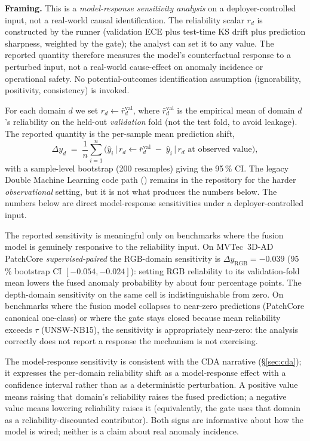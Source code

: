\documentclass[10pt,conference]{IEEEtran}
\begin{document}
\noindent\textbf{Framing.} This is a \emph{model-response sensitivity
analysis} on a deployer-controlled input, not a real-world causal
identification. The reliability scalar $r_d$ is constructed by the
runner (validation ECE plus test-time KS drift plus prediction
sharpness, weighted by the gate); the analyst can set it to any
value. The reported quantity therefore measures the model's
counterfactual response to a perturbed input, not a real-world cause-effect
on anomaly incidence or operational safety. No
potential-outcomes identification assumption (ignorability,
positivity, consistency) is invoked.

For each domain $d$ we set $r_d \leftarrow \bar r_d^{\mathrm{val}}$,
where $\bar r_d^{\mathrm{val}}$ is the empirical mean of domain
$d$'s reliability on the held-out \emph{validation} fold (not the
test fold, to avoid leakage). The reported quantity is the per-sample
mean prediction shift,
$$
  \Delta y_d \;=\; \frac{1}{n}\sum_{i=1}^{n}\big(
    \hat y_i \,\big|\, r_d{\leftarrow}\bar r_d^{\mathrm{val}}
    \;-\;
    \hat y_i \,\big|\, r_d\text{ at observed value}
  \big),
$$
with a sample-level bootstrap (200 resamples) giving the 95\,\% CI.
The legacy Double Machine Learning code path
(\cite{chernozhukov2018doubleml}) remains in the repository for the
harder \emph{observational} setting, but it is not what produces the
numbers below. The numbers below are direct model-response
sensitivities under a deployer-controlled input.

The reported sensitivity is meaningful only on benchmarks where the
fusion model is genuinely responsive to the reliability input. On
MVTec~3D-AD PatchCore \emph{supervised-paired} the RGB-domain
sensitivity is $\Delta y_{\mathrm{RGB}}=-0.039$
(95\,\% bootstrap CI $[-0.054, -0.024]$): setting RGB reliability to
its validation-fold mean lowers the fused anomaly probability by
about four percentage points. The depth-domain sensitivity on the
same cell is indistinguishable from zero. On benchmarks where the
fusion model collapses to near-zero predictions (PatchCore canonical
one-class) or where the gate stays closed because mean reliability
exceeds $\tau$ (UNSW-NB15), the sensitivity is appropriately
near-zero: the analysis correctly does not report a response the
mechanism is not exercising.

The model-response sensitivity is consistent with the CDA narrative
(§\ref{sec:cda}); it expresses the per-domain reliability shift as
a model-response effect with a confidence interval rather than as a
deterministic perturbation. A positive value means raising that
domain's reliability raises the fused prediction; a negative value
means lowering reliability raises it (equivalently, the gate uses
that domain as a reliability-discounted contributor). Both signs are
informative about how the model is wired; neither is a claim about
real anomaly incidence.
\end{document}
